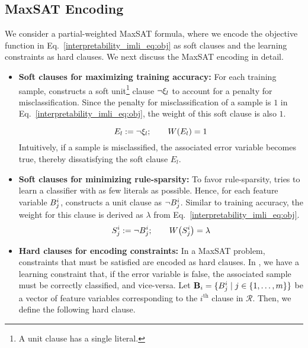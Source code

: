 \subsection{MaxSAT Encoding}
\label{interpretability_imli_sec:encoding}
We consider a partial-weighted MaxSAT formula, where we encode the objective function in Eq.~\eqref{interpretability_imli_eq:obj} as soft clauses and the learning constraints as hard clauses. We next discuss the MaxSAT encoding in detail.

\begin{itemize}
	\item \textbf{Soft clauses for maximizing training accuracy:} For each training sample, {\imli} constructs a soft unit\footnote{A unit clause has a single literal.} clause $ \neg \xi_l $ to account for a penalty for misclassification. Since the penalty for misclassification of a sample is $ 1 $  in Eq.~\eqref{interpretability_imli_eq:obj},  the weight of this soft clause is also $ 1 $. 
	
	\begin{equation}
		\label{interpretability_imli_soft_clause_error}
		E_l:=\neg \xi_l;  \qquad W \! \left( E_l \right)= 1
	\end{equation}
	Intuitively, if a sample is misclassified, the associated error variable becomes true, thereby dissatisfying the soft clause $ E_l $.
	 
	
	\item \textbf{Soft clauses for minimizing rule-sparsity:} To favor rule-sparsity, {\imli} tries to learn a classifier with as few literals as possible. Hence, for each feature variable $ B_j^i $, {\imli} constructs a unit clause as $ \neg B_j^i $. Similar to training accuracy, the weight for this clause is derived as $ \lambda $ from Eq.~\eqref{interpretability_imli_eq:obj}.
	\begin{equation}
		\label{interpretability_imli_soft_clause_feature}
		S_j^i:= \neg B_j^i; \qquad W \! \left( S_j^i \right)= \lambda
	\end{equation}
	

	
	\item \textbf{Hard clauses for encoding constraints:} In a MaxSAT problem, constraints that must be satisfied are encoded as hard clauses. In {\imli}, we have a learning constraint that, if the error variable is false, the associated sample must be correctly classified, and vice-versa. Let  $\mathbf{B}_i= \{B^i_{j} \mid j \in \{1,\dots,m \}\}$ be a vector of feature variables corresponding to the $ i^\text{th} $  clause in $ \mathcal{R} $. Then, we define the following hard clause.
	

\end{itemize}
